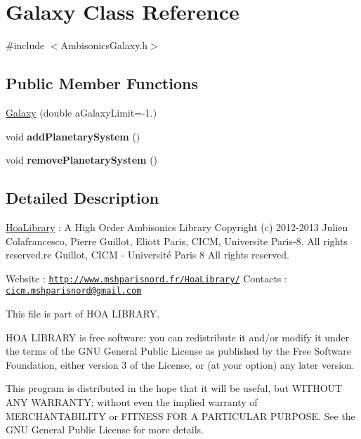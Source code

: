 \hypertarget{class_galaxy}{\section{Galaxy Class Reference}
\label{class_galaxy}
}


{\ttfamily \#include $<$Ambisonics\-Galaxy.\-h$>$}

\subsection*{Public Member Functions}
\begin{DoxyCompactItemize}
\item 
\hyperlink{class_galaxy_af8d9e83ac1f8d3885e5b31716336f099}{Galaxy} (double a\-Galaxy\-Limit=-\/1.)
\item 
\hypertarget{class_galaxy_ae00af1ac28227933e608f54852c76ec6}{void {\bfseries add\-Planetary\-System} ()}\label{class_galaxy_ae00af1ac28227933e608f54852c76ec6}

\item 
\hypertarget{class_galaxy_aadfdf8ea91926161dc4792d09b8283d1}{void {\bfseries remove\-Planetary\-System} ()}\label{class_galaxy_aadfdf8ea91926161dc4792d09b8283d1}

\end{DoxyCompactItemize}


\subsection{Detailed Description}
\hyperlink{interface_hoa_library}{Hoa\-Library} \-: A High Order Ambisonics Library Copyright (c) 2012-\/2013 Julien Colafrancesco, Pierre Guillot, Eliott Paris, C\-I\-C\-M, Universite Paris-\/8. All rights reserved.\-re Guillot, C\-I\-C\-M -\/ Université Paris 8 All rights reserved.

Website \-: \href{http://www.mshparisnord.fr/HoaLibrary/}{\tt http\-://www.\-mshparisnord.\-fr/\-Hoa\-Library/} Contacts \-: \href{mailto:cicm.mshparisnord@gmail.com}{\tt cicm.\-mshparisnord@gmail.\-com}

This file is part of H\-O\-A L\-I\-B\-R\-A\-R\-Y.

H\-O\-A L\-I\-B\-R\-A\-R\-Y is free software\-: you can redistribute it and/or modify it under the terms of the G\-N\-U General Public License as published by the Free Software Foundation, either version 3 of the License, or (at your option) any later version.

This program is distributed in the hope that it will be useful, but W\-I\-T\-H\-O\-U\-T A\-N\-Y W\-A\-R\-R\-A\-N\-T\-Y; without even the implied warranty of M\-E\-R\-C\-H\-A\-N\-T\-A\-B\-I\-L\-I\-T\-Y or F\-I\-T\-N\-E\-S\-S F\-O\-R A P\-A\-R\-T\-I\-C\-U\-L\-A\-R P\-U\-R\-P\-O\-S\-E. See the G\-N\-U General Public License for more details.


